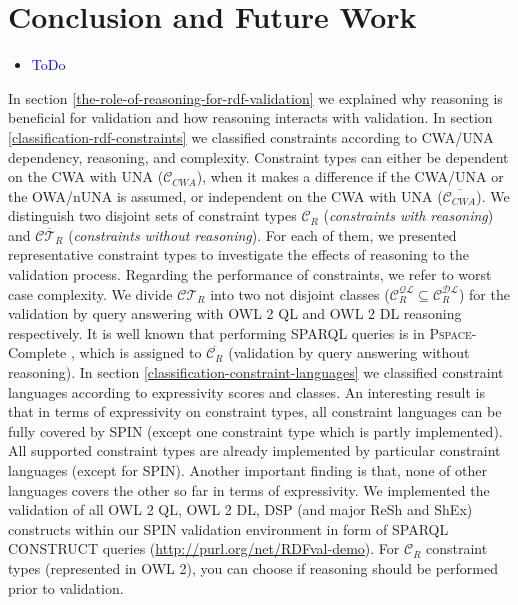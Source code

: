 \documentclass{acm_proc_article-sp}
\begin{document}

%

\section{Conclusion and Future Work}

\begin{itemize}
	\item \textcolor{blue}{ToDo}
\end{itemize}

In section \ref{the-role-of-reasoning-for-rdf-validation} we explained why reasoning is beneficial for validation and how reasoning interacts with validation.
In section \ref{classification-rdf-constraints} we classified constraints according to CWA/UNA dependency, reasoning, and complexity.
Constraint types can either be dependent on the CWA with UNA ($\mathcal{C}_{CWA}$), when it makes a difference if the CWA/UNA or the OWA/nUNA is assumed, or independent on the CWA with UNA ($\overline{\mathcal{C}_{CWA}}$).
We distinguish two disjoint sets of constraint types $\mathcal{C}_{R}$ ({\em constraints with reasoning}) and $\overline{\mathcal{CT}_{R}}$ ({\em constraints without reasoning}).
For each of them, we presented representative constraint types to investigate the effects of reasoning to the validation process.
Regarding the performance of constraints, we refer to worst case complexity.
We divide $\mathcal{CT}_R$ into two not disjoint classes ($\mathcal{C}_R ^{\mathcal{QL}} \subseteq \mathcal{C}_R ^{\mathcal{DL}}$) for the validation by query answering with OWL 2 QL and OWL 2 DL reasoning respectively.
It is well known that performing SPARQL queries is in \textsc{Pspace}-Complete \cite{Perez2009}, 
which is assigned to $\overline{\mathcal{C}_R}$ (validation by query answering without reasoning).
In section \ref{classification-constraint-languages} we classified constraint languages according to expressivity scores and classes. 
An interesting result is that in terms of expressivity on constraint types, 
all constraint languages can be fully covered by SPIN (except one constraint type which is partly implemented).
All supported constraint types are already implemented by particular constraint languages (except for SPIN).
Another important finding is that, none of other languages covers the other so far in terms of expressivity.
We implemented the validation of all OWL 2 QL, OWL 2 DL, DSP (and major ReSh and ShEx) constructs
within our SPIN validation environment in form of SPARQL CONSTRUCT queries (\url{http://purl.org/net/RDFval-demo}).
For $\mathcal{C}_{R}$ constraint types (represented in OWL 2), you can choose if reasoning should be performed prior to validation.
\end{document}
